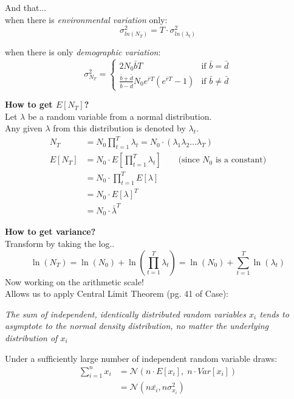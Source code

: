 \documentclass{article}
\begin{document}
And that...\\
when there is \emph{environmental variation} only:
\begin{equation*}
	\sigma^2_{ln(N_T)}=T \cdot \sigma^2_{ln(\lambda_t)}
\end{equation*}

when there is only \emph{demographic variation}:
\begin{equation*}
  \sigma_{N_T}^2 =
  \begin{cases} 
        2N_0 \bar{b} T & \text{if } \bar{b}=\bar{d} \\
        \frac{\bar{b}+\bar{d}}{\bar{b}-\bar{d}} N_0 e^{\bar{r}T}(e^{\bar{r}T}-1) & \text{if } \bar{b} \neq \bar{d}
    \end{cases}
 \end{equation*}

 
\textbf{How to get $E[N_T]$?}\\
Let $\lambda$ be a random variable from a normal distribution.\\
Any given $\lambda$ from this distribution is denoted by $\lambda_t$.
\begin{align*}
	N_T &= N_0 \prod_{t=1}^T \lambda_t = N_0 \cdot (\lambda_1 \lambda_2 \dots \lambda_T)\\
	E[N_T] &= N_0 \cdot E[\prod_{t=1}^T \lambda_t] \qquad \text{(since } N_0 \text{ is a constant)}\\
		& = N_0 \cdot \prod_{t=1}^TE[\lambda]\\
		& = N_0 \cdot E[\lambda]^T\\
		& = N_0 \cdot \bar{\lambda}^T
\end{align*}

\textbf{How to get variance?}\\
Transform by taking the log..\\
\begin{equation*}
	\ln(N_T)=\ln(N_0)+\ln\left(\prod_{t=1}^T \lambda_t\right) =\ln(N_0)+ \boxed{ \sum_{t=1}^T \ln(\lambda_t)}
\end{equation*}
Now working on the arithmetic scale!\\
Allows us to apply Central Limit Theorem (pg. 41 of Case):
\begin{center}
	\emph{The sum of independent, identically distributed random variables $x_i$ tends to asymptote to the normal density distribution, no matter the underlying distribution of $x_i$}
\end{center}

Under a sufficiently large number of independent random variable draws:
\begin{align*}
	\boxed{\sum_{i=1}^n x_i} & = \mathcal{N}(n\cdot E[x_i] , \; n\cdot Var[x_i])\\
	& = \mathcal{N}(n \bar{x_i}, n \sigma_{x_i}^2)
\end{align*}
\end{document}
